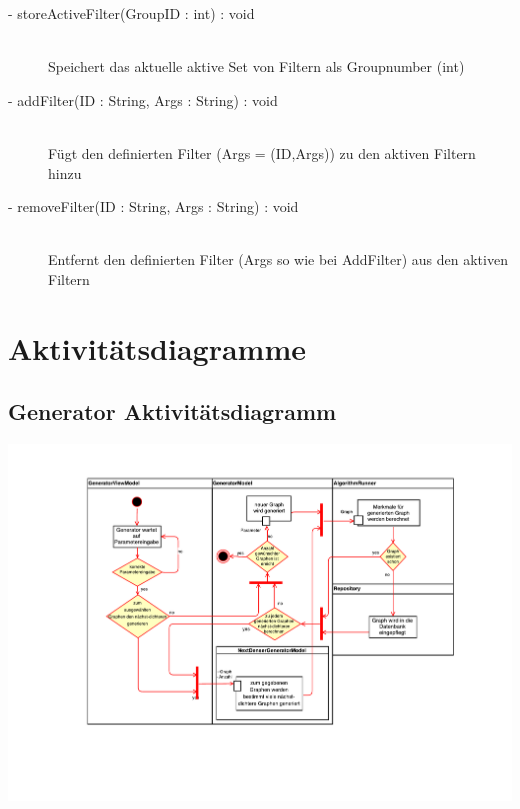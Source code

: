 \documentclass[13pt]{scrreprt}
\begin{document}
\begin{itemize}[label = {$\circ$}]
\begin{description}
			\item [- storeActiveFilter(GroupID : int) : void] \hfill \\ Speichert das aktuelle aktive Set von Filtern als Groupnumber (int)
			\item [- addFilter(ID : String, Args : String) : void] \hfill \\ Fügt den definierten Filter (Args = (ID,Args)) zu den aktiven Filtern hinzu
			\item [- removeFilter(ID : String, Args : String) : void] \hfill \\ Entfernt den definierten Filter (Args so wie bei AddFilter) aus den aktiven Filtern
		\end{description}
	\end{itemize}


\chapter{Aktivitätsdiagramme}

\section{Generator Aktivitätsdiagramm}
\includegraphics[scale=0.65,center]{GeneratorActivityDiagram.pdf}
\end{document}
